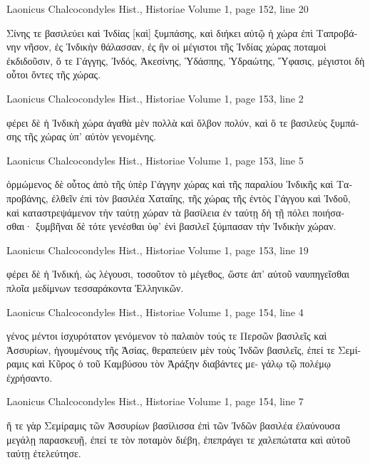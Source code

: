 \documentclass[12pt,letterpaper,twoside,final]{memoir}
\begin{document}
\begin{greek}
Laonicus Chalcocondyles Hist., Historiae 
Volume 1, page 152, line 20

                              Σίνης τε βασιλεύει καὶ Ἰνδίας [καὶ] 
ξυμπάσης, καὶ διήκει αὐτῷ ἡ χώρα ἐπὶ Ταπροβάνην νῆσον, ἐς 
Ἰνδικὴν θάλασσαν, ἐς ἣν οἱ μέγιστοι τῆς Ἰνδίας χώρας ποταμοὶ   
ἐκδιδοῦσιν, ὅ τε Γάγγης, Ἰνδός, Ἀκεσίνης, Ὑδάσπης, Ὑδραώτης, 
Ὕφασις, μέγιστοι δὴ οὗτοι ὄντες τῆς χώρας. 



Laonicus Chalcocondyles Hist., Historiae 
Volume 1, page 153, line 2

                                                      φέρει δὲ ἡ Ἰνδικὴ 
χώρα ἀγαθὰ μὲν πολλὰ καὶ ὄλβον πολύν, καὶ ὅ τε βασιλεὺς 
ξυμπάσης τῆς χώρας ὑπ' αὐτὸν γενομένης. 



Laonicus Chalcocondyles Hist., Historiae 
Volume 1, page 153, line 5

                                               ὁρμώμενος δὲ οὗτος 
ἀπὸ τῆς ὑπὲρ Γάγγην χώρας καὶ τῆς παραλίου Ἰνδικῆς καὶ 
Ταπροβάνης, ἐλθεῖν ἐπὶ τὸν βασιλέα Χαταΐης, τῆς χώρας τῆς 
ἐντὸς Γάγγου καὶ Ἰνδοῦ, καὶ καταστρεψάμενον τὴν ταύτῃ χώραν 
τὰ βασίλεια ἐν ταύτῃ δὴ τῇ πόλει ποιήσασθαι· ξυμβῆναι δὲ 
τότε γενέσθαι ὑφ' ἑνὶ βασιλεῖ ξύμπασαν τὴν Ἰνδικὴν χώραν. 



Laonicus Chalcocondyles Hist., Historiae 
Volume 1, page 153, line 19

                                         φέρει δὲ ἡ Ἰνδική, ὡς 
λέγουσι, τοσοῦτον τὸ μέγεθος, ὥστε ἀπ' αὐτοῦ ναυπηγεῖσθαι πλοῖα 
μεδίμνων τεσσαράκοντα Ἑλληνικῶν. 



Laonicus Chalcocondyles Hist., Historiae 
Volume 1, page 154, line 4

                         γένος μέντοι ἰσχυρότατον γενόμενον τὸ 
παλαιὸν τούς τε Περσῶν βασιλεῖς καὶ Ἀσσυρίων, ἡγουμένους 
τῆς Ἀσίας, θεραπεύειν μὲν τοὺς Ἰνδῶν βασιλεῖς, ἐπεί τε Σεμί-
ραμις καὶ Κῦρος ὁ τοῦ Καμβύσου τὸν Ἀράξην διαβάντες με-
γάλῳ τῷ πολέμῳ ἐχρήσαντο. 



Laonicus Chalcocondyles Hist., Historiae 
Volume 1, page 154, line 7

                                  ἥ τε γὰρ Σεμίραμις τῶν Ἀσσυρίων 
βασίλισσα ἐπὶ τῶν Ἰνδῶν βασιλέα ἐλαύνουσα μεγάλῃ παρασκευῇ, 
ἐπεί τε τὸν ποταμὸν διέβη, ἐπεπράγει τε χαλεπώτατα καὶ αὐτοῦ 
ταύτῃ ἐτελεύτησε. 




\end{greek}
\end{document}
